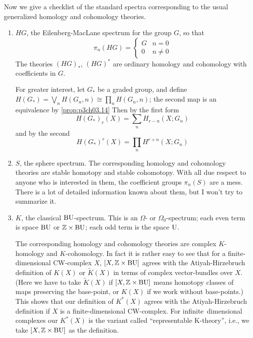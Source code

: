\documentclass[../main]{subfiles}
\begin{document}
Now we give a checklist of the standard spectra corresponding to the usual generalized homology and cohomology theories.
\begin{enumerate}[label = (\roman*)]
    \item $HG$, the Eilenberg-MacLane spectrum for the group $G$, so that
    \[\pi_n(HG) = 
    \begin{cases}
    G &n=0 \\
    0 &n\neq 0
    \end{cases}\]
    The theories $(HG)_\ast$, $(HG)^\ast$ are ordinary homology and cohomology with coefficients in $G$.
    
    For greater interest, let $G_\ast$ be a graded group, and define \newline $H(G_\ast)=\bigvee_n H(G_n, n)\cong \prod_n H(G_n, n)$; the second map is an equivalence by \ref{prop:p3ch03.14} Then by the first form
    \[H(G_\ast)_r(X)=\sum_n H_{r-n}(X;G_n)\]
    and by the second
    \[H(G_\ast)^r(X)=\prod_n H^{r+n}(X;G_n)\]
    \item $S$, the sphere spectrum. The corresponding homology and cohomology theories are stable homotopy and stable cohomotopy. With all due respect to anyone who is interested in them, the coefficient groups $\pi_n(S)$ are a mess. There is a lot of detailed information known about them, but I won't try to summarize it.
    \item $K$, the classical $\mathrm{BU}$-spectrum. This is an $\Omega$- or $\Omega_0$-spectrum; each even term is space $\mathrm{BU}$ or $\mathbb{Z}\times \mathrm{BU}$; each odd term is the space $\mathrm{U}$.
    
    The corresponding homology and cohomology theories are complex $K$-homology and $K$-cohomology. In fact it is rather easy to see that for a finite-dimensional CW-complex $X$, $[X, \mathbb{Z}\times \mathrm{BU}]$ agrees with the Atiyah-Hirzebruch definition of $K(X)$ or $\widetilde{K}(X)$ in terms of complex vector-bundles over $X$. (Here we have to take $\widetilde{K}(X)$ if $[X, \mathbb{Z}\times \mathrm{BU}]$ means homotopy classes of maps preserving the base-point, or $K(X)$ if we work without base-points.) This shows that our definition of $K^\ast(X)$ agrees with the Atiyah-Hirzebruch definition if $X$ is a finite-dimensional CW-complex. For infinite~dimensional complexes our $K^\ast(X)$ is the variant called ``representable K-theory'', i.e., we take $[X,\mathbb{Z}\times \mathrm{BU}]$ as the definition. 
    

\end{enumerate}
\end{document}
